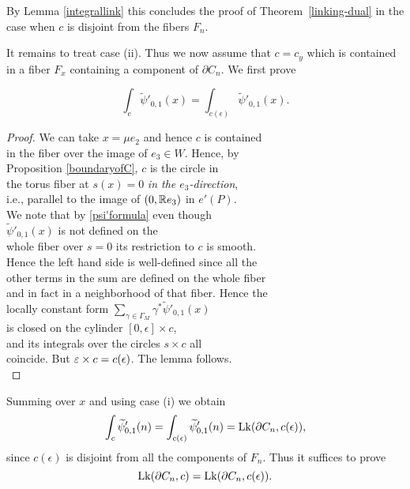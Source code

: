 By Lemma \ref{integrallink} this concludes the proof of Theorem~\ref{linking-dual} in the case when $c$ is disjoint from the fibers $F_n$.


It remains to treat case (ii). 
Thus we now assume that $c=c_y$ which is contained in a fiber $F_x$ containing a component  of $\partial C_n$.  We first prove
\begin{lemma}\label{selflinkingforx}
\[
\int_{c} \widetilde{\psi}'_{0,1}(x) =
\int_{c(\epsilon)}  \widetilde{\psi}'_{0,1}(x).
\]
\end{lemma}
\begin{proof} 
We can take $x = \mu e_2$ and hence $c$ is contained \\
in the fiber over the image of $e_3 \in W$. Hence, by \\
Proposition \ref{boundaryofC}, $c $ is the circle in \\
the torus fiber at $s(x )=0$ {\it in the $e_3$-direction}, \\
i.e., parallel to the image of $(0,\mathbb{R} e_3)$ in $e'(P)$. \\
We note that by \eqref{psi'formula} even though \\
$\widetilde{\psi}'_{0,1}(x)$ is not defined on the \\
whole fiber over $s=0$ its restriction to $c$ is smooth. \\
Hence the left hand side is well-defined since all the \\
other terms in the sum are defined on the whole fiber \\
and in fact in a neighborhood of that fiber. Hence the \\
locally constant form $\sum_{\gamma \in \Gamma_M} \gamma^* \widetilde{\psi}'_{0,1}(x)$ \\
is closed on the cylinder $[0, \epsilon] \times c $, \\
and its integrals over the circles $s \times c $ all \\
coincide. But $ \varepsilon \times c = c(\epsilon)$. The lemma follows. \\
\end{proof} 
Summing over $x$ and using case (i) we obtain
\[
\int_{c} \widetilde{\psi}'_{0,1}(n) =\int_{c(\epsilon)}  \widetilde{\psi}'_{0,1}(n) = \operatorname{Lk}(\partial C_n ,c(\epsilon)),
\]
since $c(\epsilon)$ is disjoint from all the components of $F_n$. Thus it suffices to prove 
\begin{equation}\label{lastlinkingstep}
\operatorname{Lk}(\partial C_n, c) = \operatorname{Lk}(\partial C_n, c(\epsilon)).
\end{equation}

